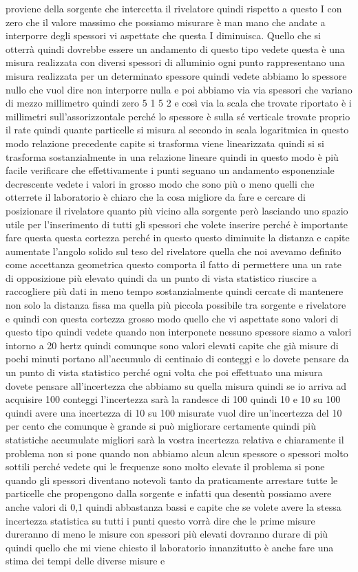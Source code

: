 proviene della sorgente che intercetta il rivelatore quindi rispetto a questo I con zero che il valore massimo che possiamo misurare è man mano che andate a interporre degli spessori vi aspettate che questa I diminuisca. Quello che si otterrà quindi dovrebbe essere un andamento di questo tipo vedete questa è una misura realizzata con diversi spessori di alluminio ogni punto rappresentano una misura realizzata per un determinato spessore quindi vedete abbiamo lo spessore nullo che vuol dire non interporre nulla e poi abbiamo via via spessori che variano di mezzo millimetro quindi zero 5 1 5 2 e così via la scala che trovate riportato è i millimetri sull'assorizzontale perché lo spessore è sulla sé verticale trovate proprio il rate quindi quante particelle si misura al secondo in scala logaritmica in questo modo relazione precedente capite si trasforma viene linearizzata quindi si si trasforma sostanzialmente in una relazione lineare quindi in questo modo è più facile verificare che effettivamente i punti seguano un andamento esponenziale decrescente vedete i valori in grosso modo che sono più o meno quelli che otterrete il laboratorio è chiaro che la cosa migliore da fare e cercare di posizionare il rivelatore quanto più vicino alla sorgente però lasciando uno spazio utile per l'inserimento di tutti gli spessori che volete inserire perché è importante fare questa questa cortezza perché in questo questo diminuite la distanza e capite aumentate l'angolo solido sul teso del rivelatore quella che noi avevamo definito come accettanza geometrica questo comporta il fatto di permettere una un rate di opposizione più elevato quindi da un punto di vista statistico riuscire a raccogliere più dati in meno tempo sostanzialmente quindi cercate di mantenere non solo la distanza fissa ma quella più piccola possibile tra sorgente e rivelatore e quindi con questa cortezza grosso modo quello che vi aspettate sono valori di questo tipo quindi vedete quando non interponete nessuno spessore siamo a valori intorno a 20 hertz quindi comunque sono valori elevati capite che già misure di pochi minuti portano all'accumulo di centinaio di conteggi e lo dovete pensare da un punto di vista statistico perché ogni volta che poi effettuato una misura dovete pensare all'incertezza che abbiamo su quella misura quindi se io arriva ad acquisire 100 conteggi l'incertezza sarà la randesce di 100 quindi 10 e 10 su 100 quindi avere una incertezza di 10 su 100 misurate vuol dire un'incertezza del 10 per cento che comunque è grande si può migliorare certamente quindi più statistiche accumulate migliori sarà la vostra incertezza relativa e chiaramente il problema non si pone quando non abbiamo alcun alcun spessore o spessori molto sottili perché vedete qui le frequenze sono molto elevate il problema si pone quando gli spessori diventano notevoli tanto da praticamente arrestare tutte le particelle che propengono dalla sorgente e infatti qua desentù possiamo avere anche valori di 0,1 quindi abbastanza bassi e capite che se volete avere la stessa incertezza statistica su tutti i punti questo vorrà dire che le prime misure dureranno di meno le misure con spessori più elevati dovranno durare di più quindi quello che mi viene chiesto il laboratorio innanzitutto è anche fare una stima dei tempi delle diverse misure e 